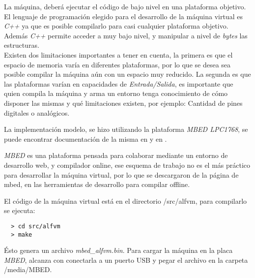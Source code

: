   La máquina, deberá ejecutar el código de bajo nivel en una plataforma
  objetivo.
  El lenguaje de programación elegido para el desarrollo de la máquina virtual
es \textit{C++} ya que es posible compilarlo para casi cualquier plataforma
objetivo.
  Además \textit{C++} permite acceder a muy bajo nivel, y manipular a
  nivel de \emph{bytes} las estructuras.\\

  Existen dos limitaciones importantes a tener en cuenta, la primera es que
el espacio de memoria varía en diferentes plataformas, por lo que se desea
sea posible compilar la máquina aún con un espacio muy reducido.
  La segunda es que las plataformas varían en capacidades
de \textit{Entrada/Salida}, es importante que quien compila la máquina y
arma un entorno tenga conocimiento de cómo disponer las mismas y qué
limitaciones existen, por ejemplo: Cantidad de pines digitales o analógicos.

  La implementación modelo, se hizo utilizando
  la plataforma \textit{MBED LPC1768},
se puede encontrar documentación de la misma en \cite{mbed-LPC1768} 
y en \cite{mbed}.

  \textit{MBED} es una plataforma pensada para colaborar mediante
  un entorno de desarrollo web, y compilador online, ese esquema de 
  trabajo no es el más práctico para desarrollar la máquina virtual, por
  lo que se descargaron de la página de mbed,
  en \cite{mbeddev} las herramientas
  de desarrollo para compilar offline.

  El código de la máquina virtual está en el directorio
  /src/alfvm, para compilarlo se ejecuta:

\begin{verbatim}
  > cd src/alfvm
  > make
\end{verbatim}

  Ésto genera un archivo \emph{mbed\_alfvm.bin}.
  Para cargar la máquina en la placa \textit{MBED}, alcanza con conectarla
  a un puerto USB y pegar el archivo en la carpeta /media/MBED.



